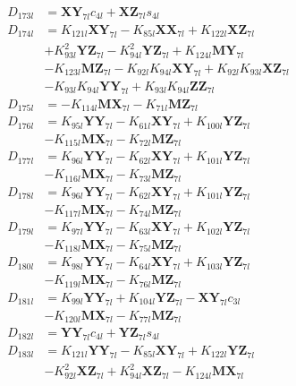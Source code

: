 \begin{multicols}{2}
\begin{align}
D_{173l} &= \mathbf{XY}_{7l}c_{4l} + \mathbf{XZ}_{7l}s_{4l} \nonumber \\
D_{174l} &= K_{121l}\mathbf{XY}_{7l} - K_{85l}\mathbf{XX}_{7l} + K_{122l}\mathbf{XZ}_{7l}  \nonumber \\
&+ K_{93l}^2\mathbf{YZ}_{7l} - K_{94l}^2\mathbf{YZ}_{7l} + K_{124l}\mathbf{MY}_{7l}  \nonumber \\
&- K_{123l}\mathbf{MZ}_{7l} - K_{92l}K_{94l}\mathbf{XY}_{7l} + K_{92l}K_{93l}\mathbf{XZ}_{7l}  \nonumber \\
&- K_{93l}K_{94l}\mathbf{YY}_{7l} + K_{93l}K_{94l}\mathbf{ZZ}_{7l} \nonumber \\
D_{175l} &= - K_{114l}\mathbf{MX}_{7l} - K_{71l}\mathbf{MZ}_{7l} \nonumber \\
D_{176l} &= K_{95l}\mathbf{YY}_{7l} - K_{61l}\mathbf{XY}_{7l} + K_{100l}\mathbf{YZ}_{7l}  \nonumber \\
&- K_{115l}\mathbf{MX}_{7l} - K_{72l}\mathbf{MZ}_{7l} \nonumber \\
D_{177l} &= K_{96l}\mathbf{YY}_{7l} - K_{62l}\mathbf{XY}_{7l} + K_{101l}\mathbf{YZ}_{7l}  \nonumber \\
&- K_{116l}\mathbf{MX}_{7l} - K_{73l}\mathbf{MZ}_{7l} \nonumber \\
D_{178l} &= K_{96l}\mathbf{YY}_{7l} - K_{62l}\mathbf{XY}_{7l} + K_{101l}\mathbf{YZ}_{7l}  \nonumber \\
&- K_{117l}\mathbf{MX}_{7l} - K_{74l}\mathbf{MZ}_{7l} \nonumber \\
D_{179l} &= K_{97l}\mathbf{YY}_{7l} - K_{63l}\mathbf{XY}_{7l} + K_{102l}\mathbf{YZ}_{7l}  \nonumber \\
&- K_{118l}\mathbf{MX}_{7l} - K_{75l}\mathbf{MZ}_{7l} \nonumber \\
D_{180l} &= K_{98l}\mathbf{YY}_{7l} - K_{64l}\mathbf{XY}_{7l} + K_{103l}\mathbf{YZ}_{7l}  \nonumber \\
&- K_{119l}\mathbf{MX}_{7l} - K_{76l}\mathbf{MZ}_{7l} \nonumber \\
D_{181l} &= K_{99l}\mathbf{YY}_{7l} + K_{104l}\mathbf{YZ}_{7l} - \mathbf{XY}_{7l}c_{3l}  \nonumber \\
&- K_{120l}\mathbf{MX}_{7l} - K_{77l}\mathbf{MZ}_{7l} \nonumber \\
D_{182l} &= \mathbf{YY}_{7l}c_{4l} + \mathbf{YZ}_{7l}s_{4l} \nonumber \\
D_{183l} &= K_{121l}\mathbf{YY}_{7l} - K_{85l}\mathbf{XY}_{7l} + K_{122l}\mathbf{YZ}_{7l}  \nonumber \\
&- K_{92l}^2\mathbf{XZ}_{7l} + K_{94l}^2\mathbf{XZ}_{7l} - K_{124l}\mathbf{MX}_{7l}  \nonumber \\

\end{align}
\end{multicols}
